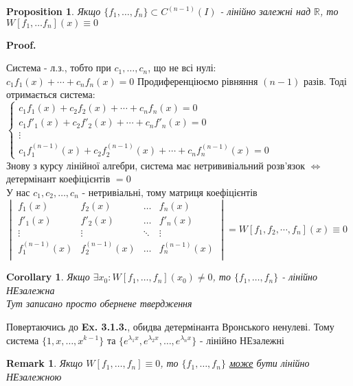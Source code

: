 \documentclass[a4paper, 10pt]{article}
\makeatletter
\def\qed{$\blacksquare$}
\theoremstyle{theoremdd}
\theoremstyle{theoremdd}
\theoremstyle{theoremdd}
\theoremstyle{theoremdd}
\theoremstyle{theoremdd}
\newtheorem{proposition}[theorem]{Proposition}
\theoremstyle{theoremdd}
\newtheorem{remark}[theorem]{Remark}
\theoremstyle{theoremdd}
\theoremstyle{theoremdd}
\newtheorem{corollary}[theorem]{Corollary}
\renewenvironment{proof}[1][Proof.\\]{\par
\pushQED{\hfill \qed}%
\normalfont \topsep6\p@\@plus6\p@\relax
\trivlist
\item\relax
{\bfseries
#1\@addpunct{.}}\hspace\labelsep\ignorespaces
}{%
\popQED\endtrivlist\@endpefalse
}
\makeatother
\begin{document}
	\begin{proposition}
 Якщо $\{f_1, \dots, f_n\} \subset C^{(n-1)}(I)$ - лінійно залежні над $\mathbb{R}$, то $W[f_1,\dots f_n](x) \equiv 0$
	\end{proposition}

	\begin{proof}
Система - л.з., тобто при $c_1, \dots, c_n$, що не всі нулі: \\$c_1f_1(x) + \cdots + c_n f_n(x) = 0$
Продиференціюємо рівняння $(n-1)$ разів. Тоді отримається система:\\
$\begin{cases}
c_1f_1(x) + c_2f_2(x) + \cdots + c_n f_n(x) = 0 \\
c_1f'_1(x) + c_2f'_2(x) + \cdots + c_n f'_n(x) = 0 \\
\vdots \\
c_1f^{(n-1)}_1(x) + c_2f^{(n-1)}_2(x) + \cdots + c_n f^{(n-1)}_n(x) = 0
\end{cases}
$\\
Знову з курсу лінійної алгебри, система має нетрививіальний розв'язок $\iff$ детермінант коефіцієнтів $= 0$\\
У нас $c_1, c_2 ,\dots, c_n$ - нетривіальні, тому матриця коефіцієнтів\\
$ \displaystyle 
\begin{vmatrix} 
	f_1(x) &  f_2(x) & \dots & f_n(x) \\ 
	f'_1(x) &  f'_2(x) & \dots & f'_n(x) \\
	\vdots &  \vdots & \ddots & \vdots \\
	f^{(n-1)}_1(x) &  f^{(n-1)}_2(x) & \dots & f^{(n-1)}_n(x) \\ 
\end{vmatrix} = W[f_1,f_2,\cdots,f_n](x) \equiv 0
$ 
	\end{proof}

\begin{corollary}
 Якщо $\exists x_0: W[f_1,\dots,f_n](x_0) \neq 0$, то $\{f_1, \dots, f_n\}$ - лінійно НЕзалежна\\
\textit{Тут записано просто обернене твердження}\\
\end{corollary}

Повертаючись до \textbf{Ex. 3.1.3.}, обидва детермінанта Вронського ненулеві. Тому система $\{1,x,\dots,x^{k-1}\}$ та $\displaystyle \{e^{\lambda_1 x}, e^{\lambda_2 x}, \dots, e^{\lambda_n x}\}$ - лінійно НЕзалежні
\begin{remark}
 Якщо $W[f_1,\dots, f_n] \equiv 0$, то $\{f_1, \dots, f_n\}$ \underline{може} бути лінійно НЕзалежною
 \end{remark}
\end{document}
